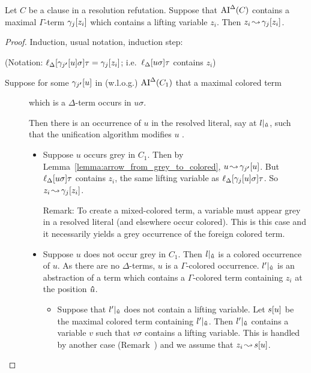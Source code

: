 \documentclass[,%
	paper=a4,%
	DIV10, %
	twoside=false,%
	liststotoc,
	bibtotoc,
	draft=false,%
	numbers=noendperiod
]{scrartcl}
\begin{document}
\begin{conj}
	Let $C$ be a clause in a resolution refutation. 
	Suppose that $\operatorname{AI}^\Delta(C)$ contains a maximal $\Gamma$-term $\gamma_j[z_i]$ which contains a lifting variable $z_i$.
	Then $z_i \operatorname{\leadsto} \gamma_j[z_i]$.
\end{conj}
\begin{proof}
	Induction, usual notation, induction step:

	(Notation: $\ell_{\Delta}[\gamma_{j\bm '}[u]\sigma]\tau = \gamma_j[z_i]$; i.e.\ $\ell_{\Delta}[u\sigma]\tau$ contains $z_i$)

	\begin{description}
		\item[Suppose for some $\gamma_{j\bm '}[u]$ in (w.l.o.g.) $\operatorname{AI}^\Delta(C_1)$ that a maximal colored term] which is a $\Delta$-term occurs in $u\sigma$.

			Then there is an occurrence of $u$ in the resolved literal, say at $l|_{\bm\hat u}$, such that the unification algorithm modifies $u$ .

			\begin{itemize}
				\item
					Suppose $u$ occurs grey in $C_1$.
					Then by Lemma~\ref{lemma:arrow_from_grey_to_colored}, $u\operatorname{\leadsto} \gamma_{j\bm '}[u]$.
					But $\ell_{\Delta}[u\sigma]\tau$ contains $z_i$,
					the same lifting variable as $\ell_{\Delta}[\gamma_j[u]\sigma]\tau$.
					So $z_i\operatorname{\leadsto} \gamma_j[z_i]$.

					Remark:
					To create a mixed-colored term, a variable must appear grey in a resolved literal (and elsewhere occur colored).
					This is this case and it necessarily yields a grey occurrence of the foreign colored term.

				\item
					Suppose $u$ does not occur grey in $C_1$.
					Then $l|_{\bm\hat{u}}$ is a colored occurrence of $u$. As there are no $\Delta$-terms, $u$ is a $\Gamma$-colored occurrence. 
					$l'|_{\bm\hat u}$ is an abstraction of a term which contains a $\Gamma$-colored term containing $z_i$ at the position $\bm\hat u$. 

					\begin{itemize}
						\item Suppose that $l'|_{\bm\hat u}$ does not contain a lifting variable. Let $s[u]$ be the maximal colored term containing $l'|_{\bm\hat u}$.
							Then $l'|_{\bm\hat u}$ contains a variable $v$ such that $v\sigma$ contains a lifting variable.
							This is handled by another case (Remark~\substremarkref) and we assume that $z_i\operatorname{\leadsto} s[u]$.


\end{itemize}
\end{itemize}
\end{description}
\end{proof}
\end{document}
